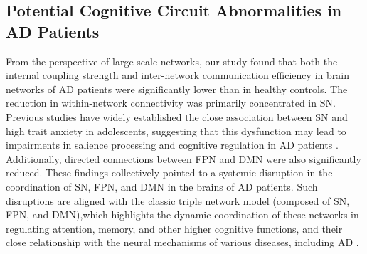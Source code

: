 \documentclass[lettersize,journal]{IEEEtran}
\begin{document}
\subsection{Potential Cognitive Circuit Abnormalities in AD Patients}
From the perspective of large-scale networks, our study found that both the internal coupling strength and inter-network communication efficiency in brain networks of AD patients were significantly lower than in healthy controls. The reduction in within-network connectivity was primarily concentrated in SN. Previous studies have widely established the close association between SN and high trait anxiety in adolescents, suggesting that this dysfunction may lead to impairments in salience processing and cognitive regulation in AD patients  \cite{geng2016decreased}.
Additionally, directed connections between FPN and DMN were also significantly reduced. These findings collectively pointed to a systemic disruption in the coordination of SN, FPN, and DMN in the brains of AD patients. Such disruptions are aligned with the classic triple network model (composed of SN, FPN, and DMN),which highlights the dynamic coordination of these networks in regulating attention, memory, and other higher cognitive functions, and their close relationship with the neural mechanisms of various diseases, including AD  \cite{zheng2015altered}  \cite{das2024electrophysiological}.
\end{document}
